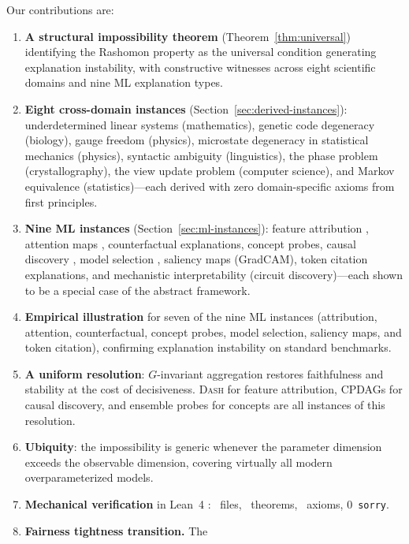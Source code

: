 \documentclass[11pt,a4paper]{article}
\newcommand{\DASH}{\textsc{Dash}}
\begin{document}
Our contributions are:
\begin{enumerate}[label=(\arabic*)]
  \item \textbf{A structural impossibility theorem}
    (Theorem~\ref{thm:universal}) identifying the Rashomon property
    as the universal condition generating explanation instability,
    with constructive witnesses across eight scientific domains and
    nine ML explanation types.
  \item \textbf{Eight cross-domain instances}
    (Section~\ref{sec:derived-instances}): underdetermined linear systems
    (mathematics), genetic code degeneracy (biology), gauge freedom
    (physics), microstate degeneracy in statistical mechanics (physics),
    syntactic ambiguity (linguistics), the phase problem
    (crystallography), the view update problem (computer science), and
    Markov equivalence (statistics)---each derived with zero domain-specific axioms from
    first principles.
  \item \textbf{Nine ML instances}
    (Section~\ref{sec:ml-instances}): feature attribution
    \citep{bilodeau2024impossibility}, attention maps
    \citep{jainwallace2019}, counterfactual explanations, concept probes,
    causal discovery \citep{verma1991equivalence}, model selection
    \citep{rudin2024amazing}, saliency maps (GradCAM), token citation explanations,
    and mechanistic interpretability (circuit
    discovery)---each shown to be a special case of the abstract framework.
  \item \textbf{Empirical illustration} for seven of the nine ML instances
    (attribution, attention, counterfactual, concept probes, model selection, saliency maps, and token citation),
    confirming explanation instability on standard benchmarks.
  \item \textbf{A uniform resolution}: $G$-invariant aggregation restores
    faithfulness and stability at the cost of decisiveness.  \DASH{} for
    feature attribution, CPDAGs for causal discovery, and ensemble probes
    for concepts are all instances of this resolution.
  \item \textbf{Ubiquity}: the impossibility is generic whenever the
    parameter dimension exceeds the observable dimension, covering
    virtually all modern overparameterized models.
  \item \textbf{Mechanical verification} in Lean~4
    \citep{demoura2021lean4}: \ClaimMainFiles~files, \ClaimMainTheorems~theorems, \ClaimMainAxioms~axioms,
    0~\texttt{sorry}.
  \item \textbf{Fairness tightness transition.}  The

\end{enumerate}
\end{document}
